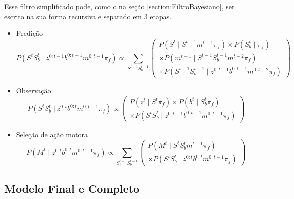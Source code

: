 Esse filtro simplificado pode, como o na seção \ref{section:FiltroBayesiano}, ser escrito na sua forma recursiva e separado em 3 etapas.

\begin{itemize}
	\item Predição
		\begin{equation}
    P \left( S^t S_b^t \mid z^{0: t-1} b^{0: t-1} m^{0: t-1} \pi_f \right) \propto \sum\limits_{S^{t-1} S_b^{t-1}}
        \left(
            \begin{array}{l}
                P \left( S^t \mid S^{t-1} m^{t-1} \pi_f \right) \times P \left( S_b^t \mid \pi_f \right) \\
                \times P \left( m^{t-1} \mid S^{t-1} S_b^{t-1} m^{t-2} \pi_f \right)\\
                \times P \left( S^{t-1} S_b^{t-1} \mid z^{0: t-1} b^{0: t-1} m^{0: t-2} \pi_f \right)
            \end{array}
        \right)
		\end{equation}
	\item Observação
		\begin{equation}
    P \left( S^t S_b^t \mid z^{0: t} b^{0: t} m^{0: t-1} \pi_f \right) \propto
        \left(
            \begin{array}{l}
                P \left( z^t \mid S^t \pi_f \right) \times P \left( b^t \mid S_b^t \pi_f \right) \\
                \times P \left( S^t S_b^t \mid z^{0: t-1} b^{0: t-1} m^{0: t-1} \pi_f \right)
            \end{array}
        \right)
		\end{equation}
	\item Seleção de ação motora
		\begin{equation}
    P \left( M^t \mid z^{0: t} b^{0: t} m^{0: t-1} \pi_f \right) \propto \sum\limits_{S_i^{t-1} S_b^{t-1}}
        \left(
            \begin{array}{l}
                P \left( M^t \mid S^t S_b^t m^{t-1} \pi_f \right)\\
                \times P \left( S^t S_b^t \mid z^{0: t} b^{0: t} m^{0: t-1} \pi_f \right)
            \end{array}
        \right)
		\end{equation}
\end{itemize}


\subsection{Modelo Final e Completo}

